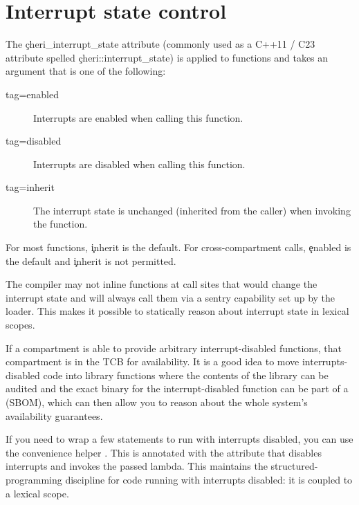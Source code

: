 {{\section{Interrupt state control}

The \c{cheri_interrupt_state} attribute (commonly used as a C++11 / C23 attribute spelled \c{cheri::interrupt_state}) is applied to functions and takes an argument that is one of the following:

\begin{description}
	\item[tag=enabled]{Interrupts are enabled when calling this function.}
	\item[tag=disabled]{Interrupts are disabled when calling this function.}
	\item[tag=inherit]{ The interrupt state is unchanged (inherited from the caller) when invoking the function.}
\end{description}

For most functions, \c{inherit} is the default.
For cross-compartment calls, \c{enabled} is the default and \c{inherit} is not permitted.

The compiler may not inline functions at call sites that would change the interrupt state and will always call them via a sentry capability set up by the loader.
This makes it possible to statically reason about interrupt state in lexical scopes.

\begin{caution}
If a compartment is able to provide arbitrary interrupt-disabled functions, that compartment is in the TCB for availability.
It is a good idea to move interrupts-disabled code into library functions where the contents of the library can be audited and the exact binary for the interrupt-disabled function can be part of a  (SBOM), which can then allow you to reason about the whole system's availability guarantees.
\end{caution}

If you need to wrap a few statements to run with interrupts disabled, you can use the convenience helper .
This is annotated with the attribute that disables interrupts and invokes the passed lambda.
This maintains the structured-programming discipline for code running with interrupts disabled: it is coupled to a lexical scope.


}}
